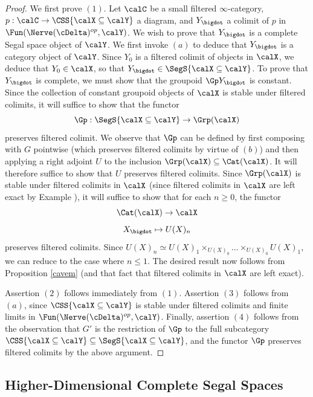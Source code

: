 \begin{proof}
We first prove $(1)$. Let $\calC$ be a small filtered $\infty$-category, $p: \calC \rightarrow \CSS{ \calX \subseteq \calY}$ a diagram, and $Y_{\bigdot}$ a colimit of $p$ in $\Fun( \Nerve(\cDelta)^{op}, \calY)$. We wish to prove that $Y_{\bigdot}$ is a complete Segal space object of $\calY$. We first invoke
$(a)$ to deduce that $Y_{\bigdot}$ is a category object of $\calY$. Since $Y_0$ is a filtered colimit of objects in $\calX$, we deduce that $Y_0 \in \calX$, so that $Y_{\bigdot} \in \SegS{ \calX \subseteq \calY}$.
To prove that $Y_{\bigdot}$ is complete, we must show that the groupoid $\Gp Y_{\bigdot}$ is constant. Since the collection of constant groupoid objects of $\calX$ is stable under filtered colimits, it will suffice to show that the functor
$$\Gp: \SegS{ \calX \subseteq \calY} \rightarrow \Grp(\calX)$$
preserves filtered colimit. We observe that $\Gp$ can be defined by first composing with
$G$ pointwise (which preserves filtered colimits by virtue of $(b)$) and then applying
a right adjoint $U$ to the inclusion $\Grp(\calX) \subseteq \Cat(\calX)$. It will therefore
suffice to show that $U$ preserves filtered colimits. Since $\Grp(\calX)$ is stable under
filtered colimits in $\calX$ (since filtered colimits in $\calX$ are left exact by Example ),
it will suffice to show that for each $n \geq 0$, the functor
$$ \Cat(\calX) \rightarrow \calX$$
$$ X_{\bigdot} \mapsto U(X)_{n}$$
preserves filtered colimits. Since $U(X)_{n} \simeq U(X)_1 \times_{U(X)_0} \ldots \times_{U(X)_0} U(X)_1$, we can reduce to the case where $n \leq 1$. The desired result now follows from Proposition \ref{cavem} (and that fact that filtered colimits in $\calX$ are left exact).

Assertion $(2)$ follows immediately from $(1)$. Assertion $(3)$ follows from $(a)$, since
$\CSS{ \calX \subseteq \calY}$ is stable under filtered colimits and finite limits in
$\Fun( \Nerve(\cDelta)^{op}, \calY)$. Finally, assertion $(4)$ follows from the observation
that $G'$ is the restriction of $\Gp$ to the full subcategory $\CSS{ \calX \subseteq \calY} \subseteq \SegS{\calX \subseteq \calY}$, and the functor $\Gp$ preserves filtered colimits by the above argument.
\end{proof}



\subsection{Higher-Dimensional Complete Segal Spaces}\label{bisec1.3}

